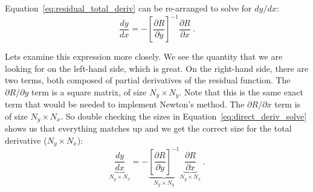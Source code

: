 \documentclass[conf]{new-aiaa}
\begin{document}
    Equation~\eqref{eq:residual_total_deriv} can be re-arranged to solve for $dy/dx$: 
    \begin{equation}
        \frac{dy}{dx} = - \left[\frac{\partial R}{\partial y}\right]^{-1} \frac{\partial R}{\partial x} \ . \label{eq:direct_deriv_solve}
    \end{equation}

    Lets examine this expression more closely. 
    We see the quantity that we are looking for on the left-hand side, which is great. 
    On the right-hand side, there are two terms, both composed of partial derivatives of the residual function. 
    The $\partial R/\partial y$ term is a square matrix, of size $N_y \times N_y$. 
    Note that this is the same exact term that would be needed to implement Newton's method. 
    The $\partial R/\partial x$ term is of size $N_y \times N_x$. 
    So double checking the sizes in Equation~\eqref{eq:direct_deriv_solve} shows us that everything matches up and we get the correct size for the total derivative ($N_y \times N_x$): 
    \begin{equation}
        \underbrace{\frac{dy}{dx}}_{N_y \times N_x} = 
        - \underbrace{\left[\frac{\partial R}{\partial y}\right]^{-1}}_{N_y \times N_y} 
        \underbrace{\frac{\partial R}{\partial x}}_{N_y \times N_x} \ . \label{eq:direct_deriv_solve}
    \end{equation}
\end{document}
